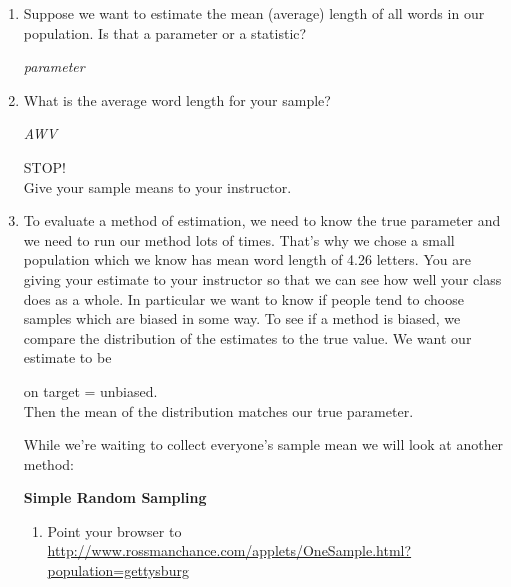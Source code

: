 \begin{enumerate}
\item Suppose we want to estimate the mean (average) length of all
  words in our population. Is that a parameter or a statistic?
\begin{students}
  \vspace{1cm}
\end{students}    
\begin{key}
   {\it parameter}
\end{key}
\item What is the average word length for your sample?
\begin{students}
  \vspace{1cm}
\end{students}    
\begin{key}
   {\it AWV}
\end{key}

  \begin{center}
    {\LARGE STOP!}\\
Give your sample means to your instructor.
  \end{center}

\item To evaluate a method of estimation, we need to know the true
  parameter and we need to run our method lots of times.  That's why we
  chose a small population which we know has mean word length of 4.26
  letters. You are giving your estimate to your instructor so that we
  can see how well your class does as a whole.  In particular we want
  to know if people tend to choose samples which are biased in some
  way. To see if a method is biased, we compare the distribution of
  the estimates to the true value.  We want our estimate to be
  \begin{center}
    {\large on target = unbiased.}\\
  Then the mean of the distribution matches our true parameter.
  \end{center}
  While we're waiting to collect everyone's sample mean we will look
  at another method:
  \begin{center}
    {\bf Simple Random Sampling}
  \end{center}
  \begin{enumerate}
    \item Point your browser to \\

\url{http://www.rossmanchance.com/applets/OneSample.html?population=gettysburg}
  
     


\end{enumerate}
\end{enumerate}
